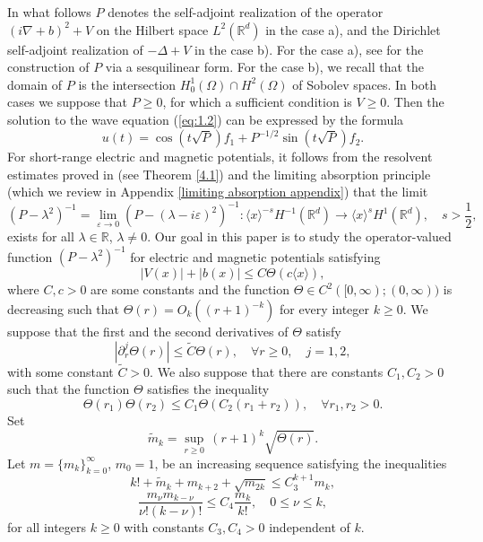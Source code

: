 \documentclass[11pt]{amsart}
\numberwithin{equation}{section}
\def\R{{\mathbb R}}
\begin{document}
In what follows $P$ denotes the self-adjoint realization of the operator $(i\nabla+b)^2+V$ on the Hilbert space
$L^2(\mathbb{R}^d)$ in the case a), and the Dirichlet self-adjoint realization of $-\Delta+V$ in the case b). For the case a), see \cite[Appendix A]{kn:LSV} for the construction of $P$ via a sesquilinear form. For the case b), we recall that the domain of $P$ is the intersection $H^1_0(\Omega) \cap H^2(\Omega)$ of Sobolev spaces. In both cases we suppose that $P\ge 0$, for which a sufficient condition is $V\ge 0$. 
Then the solution to the wave equation (\ref{eq:1.2}) can be expressed by the formula
\begin{equation}\label{eq:1.5}
u(t)=\cos\left(t\sqrt{P}\right)f_1+P^{-1/2}\sin\left(t\sqrt{P}\right)f_2.
\end{equation}
For short-range electric and magnetic potentials, it follows from the resolvent estimates proved in \cite{kn:LSV} 
 (see Theorem \ref{4.1}) and the limiting absorption principle (which we review in Appendix \ref{limiting absorption appendix}) that the limit
\begin{equation*}
(P-\lambda^2)^{-1}=\lim_{\varepsilon\to 0}(P-(\lambda-i\varepsilon)^2)^{-1}: \langle x\rangle^{-s}H^{-1}(\mathbb{R}^d)\to \langle x\rangle^{s}H^1(\mathbb{R}^d),\quad s>\frac{1}{2},
\end{equation*}
 exists for all $\lambda\in\R$, $\lambda\neq 0$. Our goal in this paper is to study the operator-valued function 
 $(P-\lambda^2)^{-1}$ for electric and magnetic potentials satisfying
\begin{equation}\label{eq:1.6}
|V(x)|+|b(x)|\le C\Theta(c\langle x\rangle),
\end{equation}
where $C,c>0$ are some constants and the function $\Theta\in C^2([0, \infty); (0, \infty))$ is decreasing such that 
$\Theta(r)=O_k((r+1)^{-k})$ for every integer $k\ge 0$. We suppose that the first and the second derivatives of $\Theta$ satisfy
\begin{equation}\label{eq:1.7}
\left|\partial_r^j\Theta(r)\right|\le\widetilde C\Theta(r),\quad\forall r\ge 0,\quad j=1,2,
\end{equation}
with some constant $\widetilde C>0$.
We also suppose that there are constants $C_1,C_2>0$ such that
the function $\Theta$ satisfies the inequality
\begin{equation}\label{eq:1.8}
\Theta(r_1)\Theta(r_2)\le C_1\Theta(C_2(r_1+r_2)),\quad\forall r_1,r_2>0.
\end{equation}
Set 
\begin{equation*}
\widetilde m_k=\sup_{r\ge 0}\,(r+1)^{k}\sqrt{\Theta(r)}.
\end{equation*}
Let $m=\{m_k\}_{k=0}^\infty$, $m_0=1$, be an increasing sequence satisfying the inequalities
\begin{equation}\label{eq:1.9}
k!+\widetilde m_k+m_{k+2}+\sqrt{m_{2k}}\le C_3^{k+1}m_k,
\end{equation}
\begin{equation}\label{eq:1.10}
\frac{m_\nu m_{k-\nu}}{\nu!(k-\nu)!}\le C_4\frac{m_k}{k!},\quad 0\le\nu\le k,
\end{equation}
for all integers $k\ge 0$ with constants $C_3,C_4>0$ independent of $k$.
\end{document}
